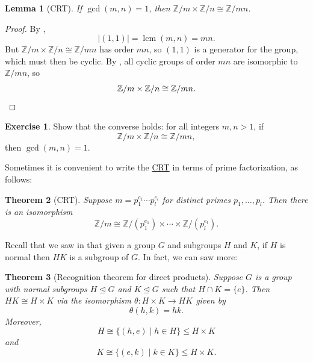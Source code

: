 \documentclass[12pt]{report}
\newtheorem{theorem}{Theorem}[chapter]
\newtheorem{lemma}[theorem]{Lemma}
\numberwithin{equation}{section}
\numberwithin{theorem}{chapter}
\theoremstyle{definition}
\newtheorem{exercise}{Exercise}
\newtheorem*{basic properties}{Basic Properties}
\newtheorem*{Important Remark}{Important Remark}
\DeclareMathOperator{\lcm}{lcm}
\begin{document}
\begin{lemma}[CRT]\label{CRT}
If $\gcd(m,n)=1$, then $\mathbb{Z}/m \times \mathbb{Z}/n\cong \mathbb{Z}/mn$. 
\end{lemma}


\begin{proof}
By ,
$$|(1,1)|=\lcm(m,n)=mn.$$ 
But $\mathbb{Z}/m\times \mathbb{Z}/n\cong \mathbb{Z}/mn$ has order $mn$, so $(1,1)$ is a generator for the group, which must then be cyclic. By , all cyclic groups of order $mn$ are isomorphic to $\mathbb{Z}/mn$, so
$$\mathbb{Z}/m\times \mathbb{Z}/n\cong \mathbb{Z}/mn.\qedhere$$
\end{proof}


\begin{exercise}\label{exercise CRT converse}
	Show that the converse holds: for all integers $m, n > 1$, if
	$$\mathbb{Z}/m\times \mathbb{Z}/n\cong \mathbb{Z}/mn,$$ 
	then $\gcd(m,n) = 1$.
\end{exercise}



Sometimes it is convenient to write the \hyperref[CRT]{CRT} in terms of prime factorization, as follows:

\begin{theorem}[CRT]\label{CRT}
Suppose $m = p_1^{e_1} \cdots p_l^{e_l}$ for distinct primes $p_1, \dots, p_l$. Then there is an isomorphism
$$\mathbb{Z}/m \cong \mathbb{Z}/(p_1^{e_1}) \times \cdots \times \mathbb{Z}/(p_l^{e_l}).$$
\end{theorem}


Recall that we saw in  that given a group $G$ and subgroups $H$ and $K$, if $H$ is normal then $HK$ is a subgroup of $G$. In fact, we can saw more:


\begin{theorem}[Recognition theorem for direct products]\label{direct product recognition}
Suppose $G$ is a group with normal subgroups $H \trianglelefteq G$ and $K \trianglelefteq G$ such that $H\cap K=\{e\}$. Then $HK\cong H\times K$ via the isomorphism $\theta\!: H \times K \to HK$ given by
$$\theta(h,k) = hk.$$ 
Moreover, 
$$H \cong \{(h,e)\mid h\in H\}\leq H\times K$$
and 
$$K\cong \{(e,k)\mid k\in K\}\leq H\times K.$$
\end{theorem}
\end{document}
